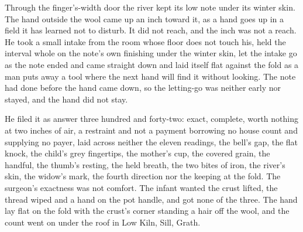 Through the finger's-width door the river kept its low note under its winter skin. The hand outside the wool came up an inch toward it, as a hand goes up in a field it has learned not to disturb. It did not reach, and the inch was not a reach. He took a small intake from the room whose floor does not touch his, held the interval whole on the note's own finishing under the winter skin, let the intake go as the note ended and came straight down and laid itself flat against the fold as a man puts away a tool where the next hand will find it without looking. The note had done before the hand came down, so the letting-go was neither early nor stayed, and the hand did not stay.

He filed it as answer three hundred and forty-two: exact, complete, worth nothing at two inches of air, a restraint and not a payment borrowing no house count and supplying no payer, laid across neither the eleven readings, the bell's gap, the flat knock, the child's grey fingertips, the mother's cup, the covered grain, the handful, the thumb's resting, the held breath, the two bites of iron, the river's skin, the widow's mark, the fourth direction nor the keeping at the fold. The surgeon's exactness was not comfort. The infant wanted the crust lifted, the thread wiped and a hand on the pot handle, and got none of the three. The hand lay flat on the fold with the crust's corner standing a hair off the wool, and the count went on under the roof in Low Kiln, Sill, Grath.
